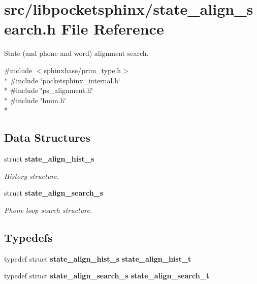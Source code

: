 \section{src/libpocketsphinx/state\+\_\+align\+\_\+search.h File Reference}
\label{state__align__search_8h}


State (and phone and word) alignment search.  


{\ttfamily \#include $<$sphinxbase/prim\+\_\+type.\+h$>$}\\*
{\ttfamily \#include \char`\"{}pocketsphinx\+\_\+internal.\+h\char`\"{}}\\*
{\ttfamily \#include \char`\"{}ps\+\_\+alignment.\+h\char`\"{}}\\*
{\ttfamily \#include \char`\"{}hmm.\+h\char`\"{}}\\*
\subsection*{Data Structures}
\begin{DoxyCompactItemize}
\item 
struct {\bf state\+\_\+align\+\_\+hist\+\_\+s}
\begin{DoxyCompactList}\small\item\em History structure. \end{DoxyCompactList}\item 
struct {\bf state\+\_\+align\+\_\+search\+\_\+s}
\begin{DoxyCompactList}\small\item\em Phone loop search structure. \end{DoxyCompactList}\end{DoxyCompactItemize}
\subsection*{Typedefs}
\begin{DoxyCompactItemize}
\item 
typedef struct {\bf state\+\_\+align\+\_\+hist\+\_\+s} {\bfseries state\+\_\+align\+\_\+hist\+\_\+t}\label{state__align__search_8h_a177ee88fd0b1e9f99bfa7cf7f9f256da}

\item 
typedef struct {\bf state\+\_\+align\+\_\+search\+\_\+s} {\bfseries state\+\_\+align\+\_\+search\+\_\+t}\label{state__align__search_8h_a4559ae74ee038260ff66f432a7205aa8}

\end{DoxyCompactItemize}
